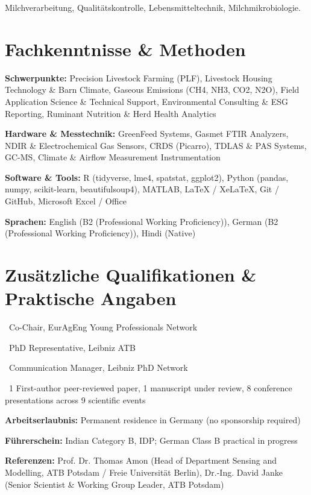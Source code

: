 \documentclass[10pt,a4paper]{article}
\begin{document}
{\small Milchverarbeitung, Qualitätskontrolle, Lebensmitteltechnik, Milchmikrobiologie.}\par



\section*{Fachkenntnisse \& Methoden}
\textbf{Schwerpunkte:} Precision Livestock Farming (PLF), Livestock Housing Technology \& Barn Climate, Gaseous Emissions (CH4, NH3, CO2, N2O), Field Application Science \& Technical Support, Environmental Consulting \& ESG Reporting, Ruminant Nutrition \& Herd Health Analytics\par

\textbf{Hardware \& Messtechnik:} GreenFeed Systems, Gasmet FTIR Analyzers, NDIR \& Electrochemical Gas Sensors, CRDS (Picarro), TDLAS \& PAS Systems, GC-MS, Climate \& Airflow Measurement Instrumentation\par

\textbf{Software \& Tools:} R (tidyverse, lme4, spatstat, ggplot2), Python (pandas, numpy, scikit-learn, beautifulsoup4), MATLAB, LaTeX / XeLaTeX, Git / GitHub, Microsoft Excel / Office\par
\textbf{Sprachen:} English (B2 (Professional Working Proficiency)), German (B2 (Professional Working Proficiency)), Hindi (Native)


\section*{Zusätzliche Qualifikationen \& Praktische Angaben}

\textbullet\ Co-Chair, EurAgEng Young Professionals Network\par

\textbullet\ PhD Representative, Leibniz ATB\par

\textbullet\ Communication Manager, Leibniz PhD Network\par

\textbullet\ 1 First-author peer-reviewed paper, 1 manuscript under review, 8 conference presentations across 9 scientific events\par

\textbf{Arbeitserlaubnis:} Permanent residence in Germany (no sponsorship required)\par

\textbf{Führerschein:} Indian Category B, IDP; German Class B practical in progress\par


\textbf{Referenzen:} Prof. Dr. Thomas Amon (Head of Department Sensing and Modelling, ATB Potsdam / Freie Universität Berlin), Dr.-Ing. David Janke (Senior Scientist \& Working Group Leader, ATB Potsdam)
\end{document}
